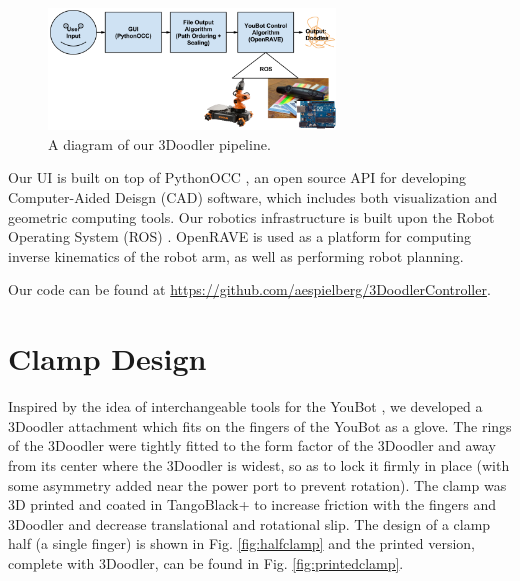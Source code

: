 \documentclass[conference]{acmsiggraph}
\begin{document}
\begin{figure}[t]
\centering
\includegraphics[width=3.0in]{images/system_arch.png}
\caption{A diagram of our 3Doodler pipeline.}
\label{fig:systemarchitecture}
\end{figure}

Our UI is built on top of PythonOCC \cite{PythonOCC}, an open source API for developing Computer-Aided Deisgn (CAD) software, which includes both visualization and geometric computing tools.  Our robotics infrastructure is built upon the Robot Operating System (ROS) \cite{ROS}.  OpenRAVE \cite{OpenRAVE} is used as a platform for computing inverse kinematics of the robot arm, as well as performing robot planning.

Our code can be found at \url{https://github.com/aespielberg/3DoodlerController}.




\section{Clamp Design}
Inspired by the idea of interchangeable tools for the YouBot \cite{Knepper13}, we developed a 3Doodler attachment which fits on the fingers of the YouBot as a glove.  The rings of the 3Doodler were tightly fitted to the form factor of the 3Doodler and away from its center where the 3Doodler is widest, so as to lock it firmly in place (with some asymmetry added near the power port to prevent rotation).  The clamp was 3D printed and coated in TangoBlack+ \cite{TangoBlack} to increase friction with the fingers and 3Doodler and decrease translational and rotational slip.  The design of a clamp half (a single finger) is shown in Fig. \ref{fig:halfclamp} and the printed version, complete with 3Doodler, can be found in Fig. \ref{fig:printedclamp}.  
\end{document}
